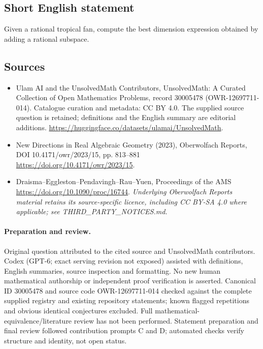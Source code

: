 \documentclass[11pt]{article}
\begin{document}
\subsection{Short English statement}
Given a rational tropical fan, compute the best dimension expression obtained by adding a rational subspace.
\subsection{Sources}
\begin{itemize}
\item[\hypertarget{source:30005478:1}{S1}] Ulam AI and the UnsolvedMath Contributors, UnsolvedMath: A Curated Collection of Open Mathematics Problems, record 30005478 (OWR-12697711-014). Catalogue curation and metadata: CC BY 4.0. The supplied source question is retained; definitions and the English summary are editorial additions.
\url{https://huggingface.co/datasets/ulamai/UnsolvedMath}.
\item[\hypertarget{source:30005478:2}{S2}] New Directions in Real Algebraic Geometry (2023), Oberwolfach Reports, DOI 10.4171/owr/2023/15, pp. 813--881
\url{https://doi.org/10.4171/owr/2023/15}.
\item[\hypertarget{source:30005478:3}{S3}] Draisma--Eggleston--Pendavingh--Rau--Yuen, Proceedings of the AMS
\url{https://doi.org/10.1090/proc/16744}.
\textit{Underlying Oberwolfach Reports material retains its source-specific licence, including CC BY-SA 4.0 where applicable; see THIRD\_PARTY\_NOTICES.md.}
\end{itemize}
\paragraph{Preparation and review.}
Original question attributed to the cited source and UnsolvedMath contributors. Codex (GPT-6; exact serving revision not exposed) assisted with definitions, English summaries, source inspection and formatting. No new human mathematical authorship or independent proof verification is asserted. Canonical ID 30005478 and source code OWR-12697711-014 checked against the complete supplied registry and existing repository statements; known flagged repetitions and obvious identical conjectures excluded. Full mathematical-equivalence/literature review has not been performed. Statement preparation and final review followed contribution prompts C and D; automated checks verify structure and identity, not open status.
\label{end:30005478}
\end{document}
